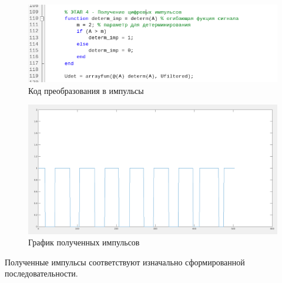 \documentclass[12pt]{article}
\begin{document}
 	 \begin{figure}[!h]
		\centering
		\includegraphics[width=\linewidth]{code_finalizing.png}
		\caption{Код преобразования в импульсы}
	\end{figure}
	
	\begin{figure}[!h]
		\centering
		\includegraphics[width=0.75\linewidth]{final_signals.png}
		\caption{График полученных импульсов}
	\end{figure}
	
 	
	Полученные импульсы соответствуют изначально сформированной последовательности.
 
\end{document}
